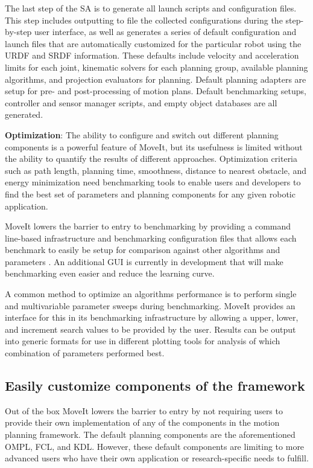 \documentclass[10pt,journal,compsoc]{joser1}
\begin{document}
{The last step of the SA is to generate all launch scripts and configuration files. This step includes outputting to file the collected configurations during the step-by-step user interface, as well as generates a series of default configuration and launch files that are automatically customized for the particular robot using the URDF and SRDF information. These defaults include velocity and acceleration limits for each joint, kinematic solvers for each planning group, available planning algorithms, and projection evaluators for planning. Default planning adapters are setup for pre- and post-processing of motion plans. Default benchmarking setups, controller and sensor manager scripts, and empty object databases are all generated. 

{\bf Optimization}: The ability to configure and switch out different planning components is a powerful feature of MoveIt, but its usefulness is limited without the ability to quantify the results of different approaches. Optimization criteria such as path length, planning time, smoothness, distance to nearest obstacle, and energy minimization need benchmarking tools to enable users and developers to find the best set of parameters and planning components for any given robotic application.

MoveIt lowers the barrier to entry to benchmarking by providing a command line-based infrastructure and benchmarking configuration files that allows each benchmark to easily be setup for comparison against other algorithms and parameters \cite{cohen2012generic}. An additional GUI is currently in development that will make benchmarking even easier and reduce the learning curve.

A common method to optimize an algorithms performance is to perform single and multivariable parameter sweeps during benchmarking. MoveIt provides an interface for this in its benchmarking infrastructure by allowing a upper, lower, and increment search values to be provided by the user. Results can be output into generic formats for use in different plotting tools for analysis of which combination of parameters performed best.

\subsection{Easily customize components of the framework}

Out of the box MoveIt lowers the barrier to entry by not requiring users to provide their own implementation of any of the components in the motion planning framework. The default planning components are the aforementioned OMPL, FCL, and KDL. However, these default components are limiting to more advanced users who have their own application or research-specific needs to fulfill. 

}
\end{document}
